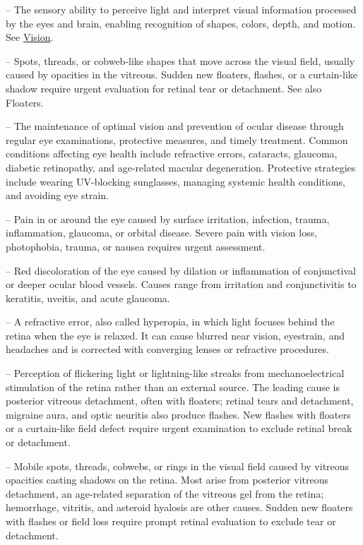 -- The sensory ability to perceive light and interpret visual information processed by the eyes and brain, enabling recognition of shapes, colors, depth, and motion. See \hyperlink{Vision}{Vision}.

-- Spots, threads, or cobweb-like shapes that move across the visual field, usually caused by opacities in the vitreous. Sudden new floaters, flashes, or a curtain-like shadow require urgent evaluation for retinal tear or detachment. See also Floaters.

-- The maintenance of optimal vision and prevention of ocular disease through regular eye examinations, protective measures, and timely treatment. Common conditions affecting eye health include refractive errors, cataracts, glaucoma, diabetic retinopathy, and age-related macular degeneration. Protective strategies include wearing UV-blocking sunglasses, managing systemic health conditions, and avoiding eye strain.

-- Pain in or around the eye caused by surface irritation, infection, trauma, inflammation, glaucoma, or orbital disease. Severe pain with vision loss, photophobia, trauma, or nausea requires urgent assessment.

-- Red discoloration of the eye caused by dilation or inflammation of conjunctival or deeper ocular blood vessels. Causes range from irritation and conjunctivitis to keratitis, uveitis, and acute glaucoma.

-- A refractive error, also called hyperopia, in which light focuses behind the retina when the eye is relaxed. It can cause blurred near vision, eyestrain, and headaches and is corrected with converging lenses or refractive procedures.

-- Perception of flickering light or lightning-like streaks from mechanoelectrical stimulation of the retina rather than an external source. The leading cause is posterior vitreous detachment, often with floaters; retinal tears and detachment, migraine aura, and optic neuritis also produce flashes. New flashes with floaters or a curtain-like field defect require urgent examination to exclude retinal break or detachment.

-- Mobile spots, threads, cobwebs, or rings in the visual field caused by vitreous opacities casting shadows on the retina. Most arise from posterior vitreous detachment, an age-related separation of the vitreous gel from the retina; hemorrhage, vitritis, and asteroid hyalosis are other causes. Sudden new floaters with flashes or field loss require prompt retinal evaluation to exclude tear or detachment.


